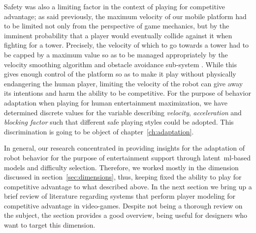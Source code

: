 Safety was also a limiting factor in the context of playing for competitive advantage; as said previously, the maximum velocity of our mobile platform had to be limited not only from the perspective of game mechanics, but by the imminent probability that a player would eventually collide against it when fighting for a tower. Precisely, the velocity of which to go towards a tower had to be capped by a maximum value so as to be managed appropriately by the velocity smoothing algorithm and obstacle avoidance sub-system%
. While this gives enough control of the platform so as to make it play %
without physically endangering the human player, limiting the velocity of the robot can give away its intentions and harm the ability to be competitive. For the purpose of behavior adaptation when playing for human entertainment maximization, we have determined discrete values for the variable describing \textit{velocity}, \textit{acceleration} and \textit{blocking factor} such that different safe playing styles could be adopted. This discrimination is going to be object of chapter~\ref{ch:adaptation}.

In general, our research concentrated in providing insights for the adaptation of robot behavior for the purpose of entertainment support through latent~\gls{ml}-based models and difficulty selection. Therefore, we worked mostly in the dimension discussed in section~\ref{sec:dimensions}, thus, keeping fixed the ability to play for competitive advantage to what described above. In the next section we bring up a brief review of literature regarding systems that perform player modeling for competitive advantage in video-games. Despite not being a thorough review on the subject, the section provides a good overview, being useful for designers who want to target this dimension.


